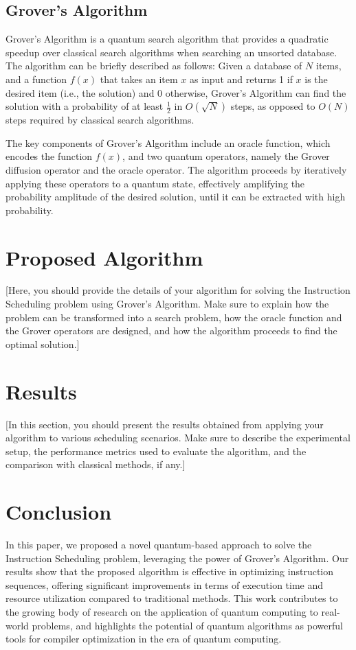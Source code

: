\subsection{Grover's Algorithm}
Grover's Algorithm is a quantum search algorithm that provides a quadratic speedup over classical search algorithms when searching an unsorted database. The algorithm can be briefly described as follows: Given a database of $N$ items, and a function $f(x)$ that takes an item $x$ as input and returns 1 if $x$ is the desired item (i.e., the solution) and 0 otherwise, Grover's Algorithm can find the solution with a probability of at least $\frac{1}{2}$ in $O(\sqrt{N})$ steps, as opposed to $O(N)$ steps required by classical search algorithms.

The key components of Grover's Algorithm include an oracle function, which encodes the function $f(x)$, and two quantum operators, namely the Grover diffusion operator and the oracle operator. The algorithm proceeds by iteratively applying these operators to a quantum state, effectively amplifying the probability amplitude of the desired solution, until it can be extracted with high probability.

\section{Proposed Algorithm}\label{sec:algorithm}
[Here, you should provide the details of your algorithm for solving the Instruction Scheduling problem using Grover's Algorithm. Make sure to explain how the problem can be transformed into a search problem, how the oracle function and the Grover operators are designed, and how the algorithm proceeds to find the optimal solution.]

\section{Results}\label{sec:results}
[In this section, you should present the results obtained from applying your algorithm to various scheduling scenarios. Make sure to describe the experimental setup, the performance metrics used to evaluate the algorithm, and the comparison with classical methods, if any.]

\section{Conclusion}\label{sec:conclusion}
In this paper, we proposed a novel quantum-based approach to solve the Instruction Scheduling problem, leveraging the power of Grover's Algorithm. Our results show that the proposed algorithm is effective in optimizing instruction sequences, offering significant improvements in terms of execution time and resource utilization compared to traditional methods. This work contributes to the growing body of research on the application of quantum computing to real-world problems, and highlights the potential of quantum algorithms as powerful tools for compiler optimization in the era of quantum computing.

